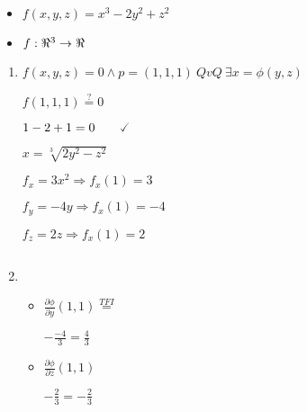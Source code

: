 \documentclass[../practica_04.tex]{subfiles}
\begin{document}
    \begin{itemize}
        \item $f(x,y,z) = x^3-2y^2+z^2$
        \item $f: \real^3 \to \real$
    \end{itemize}

    \begin{enumerate}
        \item $ f(x,y,z) = 0 \wedge p = (1,1,1)\ QvQ\ \exists x = \phi(y,z) $
        
            $ f(1,1,1) \stackrel{?}{=} 0 $

            $ 1 - 2 + 1 = 0 \qquad\checked $

            $ x = \sqrt[3]{2y^2-z^2} $

            $ f_x = 3x^2 \Rightarrow f_x(1) = 3 $

            $ f_y = -4y \Rightarrow f_x(1) = -4 $

            $ f_z = 2z \Rightarrow f_x(1) = 2 $

            $ $

        \item 
            \begin{itemize}
                \item $ \frac{\partial \phi}{\partial y}(1,1) \stackrel{TFI}{=}$

                    $ -\frac{-4}{3} = \frac{4}{3} $

                \item $ \frac{\partial \phi}{\partial z}(1,1) $

                    $ -\frac{2}{3} = -\frac{2}{3} $

            \end{itemize}
    \end{enumerate}
\end{document}
